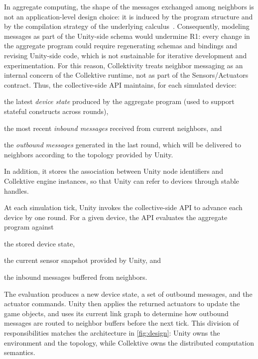 \documentclass[runningheads]{llncs}
\newenvironment{inlinelist}{\begin{enumerate*}[label=\emph{(\roman*)}]}{\end{enumerate*}}
\begin{document}
In aggregate computing, the shape of the messages exchanged among neighbors is not an application-level design choice:
it is induced by the program structure and by the compilation strategy of the underlying calculus~\cite{DBLP:journals/tocl/AudritoVDPB19}.
%
Consequently, modeling messages as part of the Unity-side schema would undermine R1:
every change in the aggregate program could require regenerating schemas and bindings and revising Unity-side code,
which is not sustainable for iterative development and experimentation.
%
For this reason, Collektivity treats neighbor messaging as an internal concern of the Collektive runtime, not as part of the
Sensors/Actuators contract.
%
Thus, the collective-side \ac{API} maintains, for each simulated device:
\begin{inlinelist}
    \item the latest \emph{device state} produced by the aggregate program (used to support stateful constructs across rounds),
    \item the most recent \emph{inbound messages} received from current neighbors, and
    \item the \emph{outbound messages} generated in the last round, which will be delivered to neighbors according to the topology provided by Unity.
\end{inlinelist}
In addition, it stores the association between Unity node identifiers and Collektive engine instances,
so that Unity can refer to devices through stable handles.

At each simulation tick, Unity invokes the collective-side \ac{API} to advance each device by one round.
For a given device, the \ac{API} evaluates the aggregate program against
\begin{inlinelist}
    \item the stored device state,
    \item the current sensor snapshot provided by Unity,
    and
    \item the inbound messages buffered from neighbors.
\end{inlinelist}
%
The evaluation produces a new device state, a set of outbound messages, and the actuator commands.
%
Unity then applies the returned actuators to update the game objects, and uses its current link graph to determine how outbound messages
are routed to neighbor buffers before the next tick.
%
This division of responsibilities matches the architecture in \cref{fig:design}:
Unity owns the environment and the topology,
while Collektive owns the distributed computation semantics.
\end{document}

